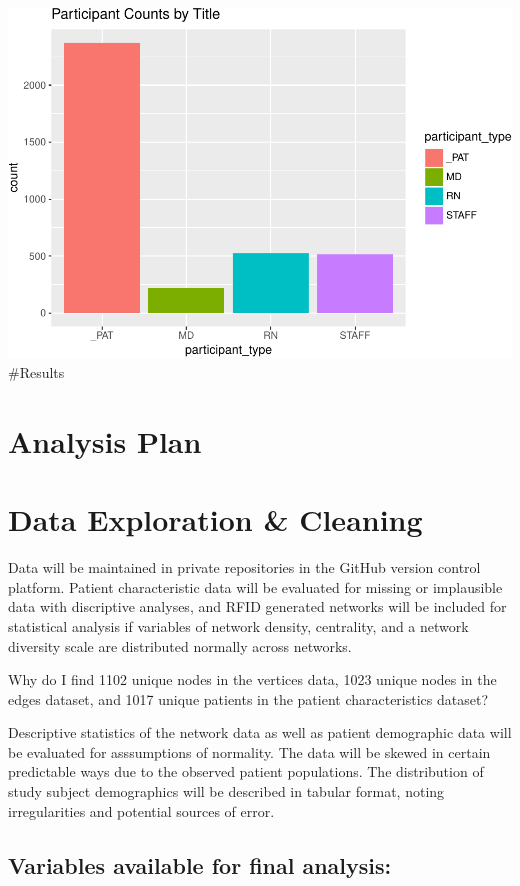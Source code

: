 \documentclass[]{elsarticle} %
\makeatletter
\def\maxwidth{\ifdim\Gin@nat@width>\linewidth\linewidth
\else\Gin@nat@width\fi}
\let\Oldincludegraphics\includegraphics
\renewcommand{\includegraphics}[1]{\Oldincludegraphics[width=\maxwidth]{#1}}
\makeatother
\begin{document}
\includegraphics{Flynn_Project_files/figure-latex/assign datasets-2.pdf}
\#Results

\section{Analysis Plan}\label{analysis-plan}

\section{Data Exploration \& Cleaning}\label{data-exploration-cleaning}

Data will be maintained in private repositories in the GitHub version
control platform. Patient characteristic data will be evaluated for
missing or implausible data with discriptive analyses, and RFID
generated networks will be included for statistical analysis if
variables of network density, centrality, and a network diversity scale
are distributed normally across networks.

Why do I find 1102 unique nodes in the vertices data, 1023 unique nodes
in the edges dataset, and 1017 unique patients in the patient
characteristics dataset?

Descriptive statistics of the network data as well as patient
demographic data will be evaluated for asssumptions of normality. The
data will be skewed in certain predictable ways due to the observed
patient populations. The distribution of study subject demographics will
be described in tabular format, noting irregularities and potential
sources of error.

\subsection{Variables available for final
analysis:}\label{variables-available-for-final-analysis}
\end{document}
